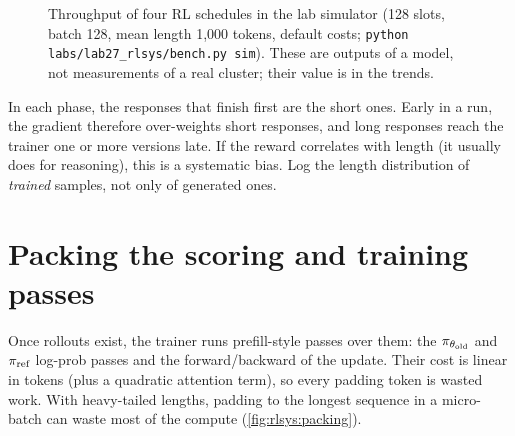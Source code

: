 \begin{figure}[t]
\centering
{}
\caption{Throughput of four RL schedules in the lab simulator (128 slots, batch 128, mean
length 1{,}000 tokens, default costs; \texttt{python labs/lab27\_rlsys/bench.py sim}).
These are outputs of a model, not measurements of a real cluster; their value is in the
trends.}
\label{fig:rlsys:simresults}
\end{figure}

\begin{pitfall}
In each phase, the responses that finish first are the short ones. Early in a run, the
gradient therefore over-weights short responses, and long responses reach the trainer one or
more versions late. If the reward correlates with length (it usually does for reasoning),
this is a systematic bias. Log the length distribution of \emph{trained} samples, not only of
generated ones.
\end{pitfall}

\section{Packing the scoring and training passes}\label{sec:rlsys:packing}

Once rollouts exist, the trainer runs prefill-style passes over them: the $\pi_{\theta_{\text{old}}}$ and $\pi_{\text{ref}}$
log-prob passes and the forward/backward of the update. Their cost is linear in tokens (plus a
quadratic attention term), so every padding token is wasted work. With heavy-tailed lengths,
padding to the longest sequence in a micro-batch can waste most of the compute
(\cref{fig:rlsys:packing}).

